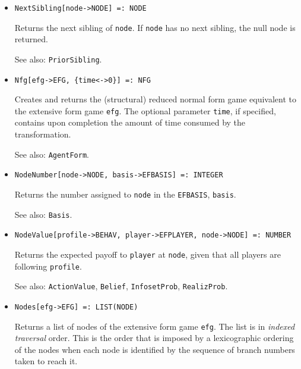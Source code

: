 \begin{itemize}
\item{}
\protect \large \begin{verbatim}
NextSibling[node->NODE] =: NODE 
\end{verbatim}\normalsize

\bd
Returns the next sibling of \verb+node+.  If \verb+node+ has no next
sibling, the null node is returned.
\item [See also:] \verb+PriorSibling+.
\ed

\item{}
\protect \large \begin{verbatim}
Nfg[efg->EFG, {time<->0}] =: NFG 
\end{verbatim}\normalsize

\bd
Creates and returns the (structural) reduced normal form game equivalent
to the extensive form game \verb+efg+.  The optional parameter \verb+time+,
if specified, contains upon completion the amount of time consumed by
the transformation.
\item [See also:] \verb+AgentForm+.
\ed

\item{}
\protect \large \begin{verbatim}
NodeNumber[node->NODE, basis->EFBASIS] =: INTEGER 
\end{verbatim}\normalsize

\bd Returns the number assigned to \verb+node+ in the \verb+EFBASIS+,
\verb+basis+.
\item [See also:] \verb+Basis+. 
\ed

\item{}
\protect \large \begin{verbatim}
NodeValue[profile->BEHAV, player->EFPLAYER, node->NODE] =: NUMBER 
\end{verbatim}\normalsize

\bd
Returns the expected payoff to \verb+player+ at \verb+node+, given
that all players are following \verb+profile+.
\item [See also:] \verb+ActionValue+, \verb+Belief+, \verb+InfosetProb+,
\verb+RealizProb+.
\ed

\item{}
\protect \large \begin{verbatim}
Nodes[efg->EFG] =: LIST(NODE) 
\end{verbatim}\normalsize

\bd
Returns a list of nodes of the extensive form game \verb+efg+.  The
list is in {\it indexed traversal} order.  This is the order that is
imposed by a lexicographic ordering of the nodes when each node is
identified by the sequence of branch numbers taken to reach it.  
\ed


\end{itemize}
